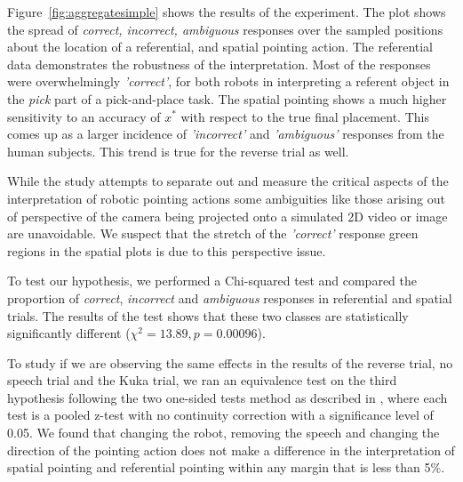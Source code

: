 Figure~\ref{fig:aggregatesimple} shows the results of the experiment. The plot shows the spread of \textit{correct, incorrect, ambiguous} responses over the sampled positions about the location of a referential, and spatial pointing action. The referential data demonstrates the robustness of the interpretation. Most of the responses were overwhelmingly \textit{'correct'}, for both robots in interpreting a referent object in the \textit{pick} part of a pick-and-place task. The spatial pointing shows a much higher sensitivity to an accuracy of $x^*$ with respect to the true final placement. This comes up as a larger incidence of \textit{'incorrect'} and \textit{'ambiguous'} responses from the human subjects. This trend is true for the reverse trial as well.

While the study attempts to separate out and measure the critical aspects of the interpretation of robotic pointing actions some ambiguities like those arising out of perspective of the camera being projected onto a simulated 2D video or image are unavoidable. We suspect that the stretch of the \textit{'correct'} response green regions in the spatial plots is due to this perspective issue.

To test our hypothesis, we performed a Chi-squared test and compared the proportion of \textit{correct}, \textit{incorrect} and \textit{ambiguous} responses in referential and spatial trials. The results of the test shows that these two classes are statistically significantly different ($\chi^2= 13.89, p = 0.00096$).

To study if we are observing the same effects in the results of the reverse trial, no speech trial and the Kuka trial, we ran an equivalence test on the third hypothesis following the two one-sided tests method as described in \cite{lakens2017equivalence}, where each test is a pooled z-test with no continuity
correction with a significance level of 0.05. We found that changing the robot, removing the speech and changing the direction of the pointing action does not make a difference in the interpretation of spatial pointing and referential pointing within any margin that is less than 5\%.



